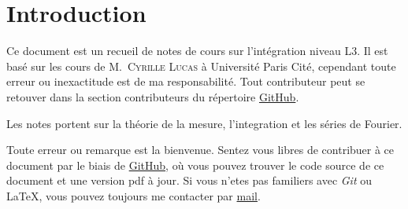 \section{Introduction}

Ce document est un recueil de notes de cours sur l'intégration niveau L3. Il est
basé sur les cours de M.~\textsc{Cyrille Lucas} à Université Paris Cité, cependant toute
erreur ou inexactitude est de ma responsabilité. Tout contributeur
peut se retouver dans la section contributeurs du répertoire
\href{https://github.com/Yag000/integration-notes/graphs/contributors}{GitHub}.
\vspace{0.5cm}

Les notes portent sur la théorie de la mesure, l'integration et les séries de Fourier.
\vspace{0.5cm}

Toute erreur ou remarque est la bienvenue.
Sentez vous libres de contribuer à ce document par le biais de \href{https://github.com/Yag000/integration-notes}{GitHub},
où vous pouvez trouver le code source de ce document et une version pdf à jour.
Si vous n'etes pas familiers avec \textit{Git} ou \LaTeX , vous pouvez toujours me contacter
par \href{mailto: yago.iglesias.vazquez@gmail.com}{mail}.





